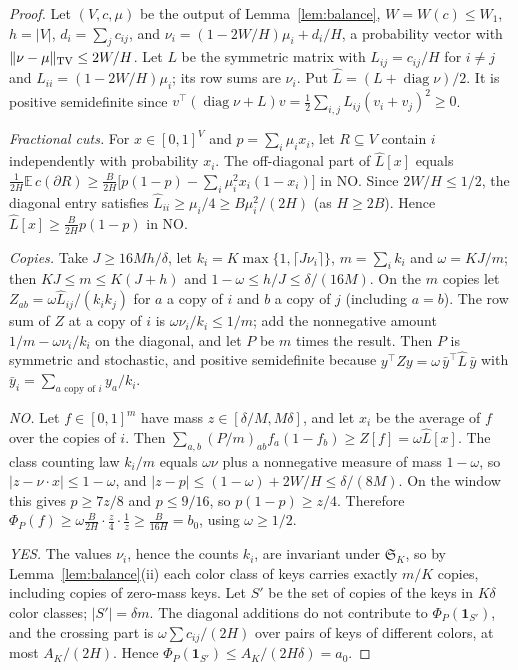 \documentclass[11pt,letterpaper]{article}
\theoremstyle{definition}
\theoremstyle{remark}
\newcommand{\E}{\mathbb E}
\newcommand{\ind}{\mathbf 1}
\begin{document}
\begin{proof}
Let \((V,c,\mu)\) be the output of Lemma~\ref{lem:balance}, \(W=W(c)\le
W_1\), \(h=|V|\), \(d_i=\sum_jc_{ij}\), and
\(\nu_i=(1-2W/H)\mu_i+d_i/H\), a probability vector with
\(\|\nu-\mu\|_{\rm TV}\le2W/H\). Let \(L\) be the symmetric matrix with
\(L_{ij}=c_{ij}/H\) for \(i\ne j\) and \(L_{ii}=(1-2W/H)\mu_i\); its row sums
are \(\nu_i\). Put \(\widehat L=(L+\operatorname{diag}\nu)/2\). It is positive
semidefinite since \(v^{\top}(\operatorname{diag}\nu+L)v=\frac12\sum_{i,j}
L_{ij}(v_i+v_j)^2\ge0\).

\emph{Fractional cuts.} For \(x\in[0,1]^V\) and \(p=\sum_i\mu_ix_i\), let
\(R\subseteq V\) contain \(i\) independently with probability \(x_i\). The
off-diagonal part of \(\widehat L[x]\) equals \(\frac1{2H}\E\,c(\partial
R)\ge\frac B{2H}\bigl[p(1-p)-\sum_i\mu_i^2x_i(1-x_i)\bigr]\) in NO. Since
\(2W/H\le1/2\), the diagonal entry satisfies \(\widehat
L_{ii}\ge\mu_i/4\ge B\mu_i^2/(2H)\) (as \(H\ge2B\)). Hence
\(\widehat L[x]\ge\frac B{2H}p(1-p)\) in NO.

\emph{Copies.} Take \(J\ge16Mh/\delta\), let \(k_i=K\max\{1,\lceil
J\nu_i\rceil\}\), \(m=\sum_ik_i\) and \(\omega=KJ/m\); then \(KJ\le m\le
K(J+h)\) and \(1-\omega\le h/J\le\delta/(16M)\). On the \(m\) copies let
\(Z_{ab}=\omega\widehat L_{ij}/(k_ik_j)\) for \(a\) a copy of \(i\) and \(b\)
a copy of \(j\) (including \(a=b\)). The row sum of \(Z\) at a copy of \(i\)
is \(\omega\nu_i/k_i\le1/m\); add the nonnegative amount
\(1/m-\omega\nu_i/k_i\) on the diagonal, and let \(P\) be \(m\) times the
result. Then \(P\) is symmetric and stochastic, and positive semidefinite
because \(y^{\top}Zy=\omega\,\bar y^{\top}\widehat L\,\bar y\) with
\(\bar y_i=\sum_{a\text{ copy of }i}y_a/k_i\).

\emph{NO.} Let \(f\in[0,1]^m\) have mass \(z\in[\delta/M,M\delta]\), and let
\(x_i\) be the average of \(f\) over the copies of \(i\). Then
\(\sum_{a,b}(P/m)_{ab}f_a(1-f_b)\ge Z[f]=\omega\widehat L[x]\). The class
counting law \(k_i/m\) equals \(\omega\nu\) plus a nonnegative measure of mass
\(1-\omega\), so \(|z-\nu\cdot x|\le1-\omega\), and
\(|z-p|\le(1-\omega)+2W/H\le\delta/(8M)\). On the window this gives
\(p\ge7z/8\) and \(p\le9/16\), so \(p(1-p)\ge z/4\). Therefore
\(\Phi_P(f)\ge\omega\frac B{2H}\cdot\frac z4\cdot\frac1z\ge\frac B{16H}=b_0\),
using \(\omega\ge1/2\).

\emph{YES.} The values \(\nu_i\), hence the counts \(k_i\), are invariant
under \(\mathfrak S_K\), so by Lemma~\ref{lem:balance}(ii) each color class
of keys carries exactly \(m/K\) copies, including copies of zero-mass keys.
Let \(S'\) be the set of copies of the keys in \(K\delta\) color classes;
\(|S'|=\delta m\). The diagonal additions do not contribute to
\(\Phi_P(\ind_{S'})\), and the crossing part is \(\omega\sum c_{ij}/(2H)\)
over pairs of keys of different colors, at most \(A_K/(2H)\). Hence
\(\Phi_P(\ind_{S'})\le A_K/(2H\delta)=a_0\).
\end{proof}
\end{document}
